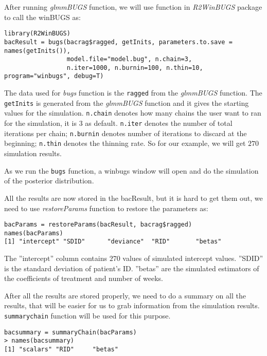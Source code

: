 \documentclass{article}
\begin{document}
After running \textit{glmmBUGS} function, we will use  function in \textit{R2WinBUGS} package
to call the winBUGS as: 
\begin{verbatim}
library(R2WinBUGS)
bacResult = bugs(bacrag$ragged, getInits, parameters.to.save = names(getInits()),
                 model.file="model.bug", n.chain=3, 
                 n.iter=1000, n.burnin=100, n.thin=10, program="winbugs", debug=T)
\end{verbatim}
The data used for \textit{bugs} function is the \verb!ragged! from the \textit{glmmBUGS} function. The \verb!getInits! is generated from the \textit{glmmBUGS} function and it gives the starting values for the simulation. \verb!n.chain! denotes how many chains the user want to ran for the simulation, it is $3$ as default. \verb!n.iter!
denotes the number of total iterations per chain; \verb!n.burnin! denotes number of iterations to discard at the beginning; \verb!n.thin! denotes the thinning rate. So for our example, we will get $270$ simulation results.

As we run the \verb!bugs! function, a winbugs window will open and do the simulation of the posterior distribution.

All the results are now stored in the bacResult, but it is hard to get them out, we need to use  \textit{restoreParams} function to restore the parameters as: 

\begin{verbatim}
bacParams = restoreParams(bacResult, bacrag$ragged) 
names(bacParams)
[1] "intercept" "SDID"      "deviance"  "RID"       "betas"    
\end{verbatim}

The ''intercept'' column contains $270$ values of simulated intercept values. ''SDID'' is the standard deviation of patient's ID. 
''betas'' are the simulated estimators of the coefficients of treatment and number of weeks. 

After all the results are stored properly, we need to do a summary on all the results, that will be easier for us to grab information from the simulation results. \verb!summarychain! function will be used for this purpose.
\begin{verbatim}
bacsummary = summaryChain(bacParams)
> names(bacsummary)
[1] "scalars" "RID"     "betas"  

\end{verbatim}
\end{document}
